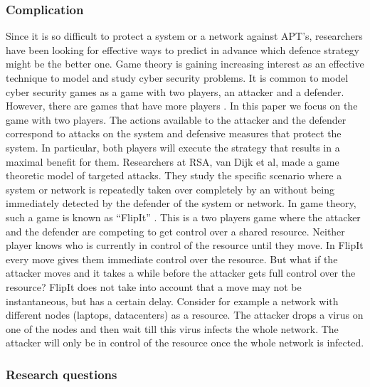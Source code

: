 \subsubsection{Complication}
Since it is so difficult to protect a system or a network against APT's, researchers have been looking for effective ways to predict in advance which defence strategy might be the better one. 
Game theory is gaining increasing interest as an effective technique to model and study cyber security problems. It is common to model cyber security games as a game with two players, an attacker and a defender. However, there are games that have more players \cite{fengstealthy}. In this paper we focus on the game with two players. The actions available to the attacker and the defender correspond to attacks on the system and defensive measures that protect the system. In particular, both players will execute the strategy that results in a maximal benefit for them.  Researchers at RSA, van Dijk et al,  made a game theoretic model of targeted attacks. They study the specific scenario where a system or network is repeatedly taken over completely by an without being immediately detected by the defender of the system or network. In game theory, such a game is known as ``FlipIt'' \cite{FlipIt}. This is a two players game where the attacker and the defender are competing to get control over a shared resource. Neither player knows who is currently in control of the resource until they move. In FlipIt every move gives them immediate control over the resource. But what if the attacker moves and it takes a while before the attacker gets full control over the resource? FlipIt does not take into account that a move may not be instantaneous, but has a certain delay. Consider for example a network with different nodes (laptops, datacenters) as a resource. The attacker drops a virus on one of the nodes and then wait till this virus infects the whole network. The attacker will only be in control of the resource once the whole network is infected. \\

\subsubsection{Research questions}


